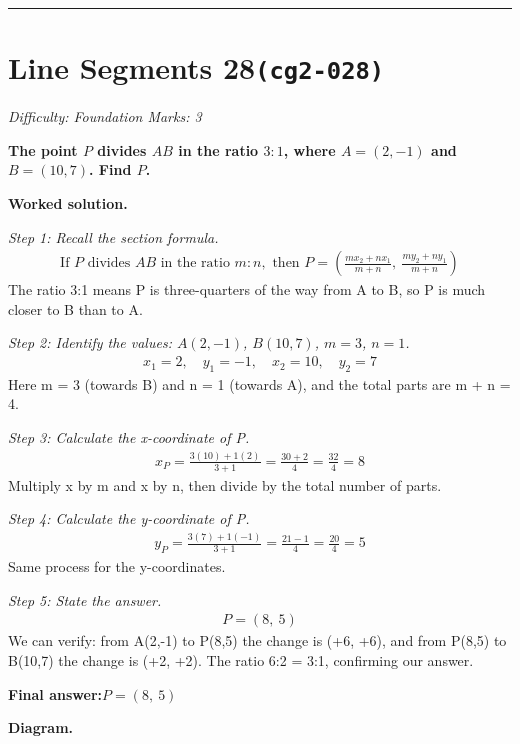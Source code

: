 \documentclass[11pt]{article}
\newcommand{\question}[1]{\par\medskip\noindent\textbf{#1}\par}
\begin{document}
\medskip\hrule

\section*{Line Segments 28\quad\small\texttt{(cg2-028)}}
\textit{Difficulty: Foundation \quad\textbar\quad Marks: 3}

\question{The point \( P \) divides \( AB \) in the ratio \( 3:1 \), where \( A = (2, -1) \) and \( B = (10, 7) \). Find \( P \).}

\textbf{Worked solution.}

\textit{Step 1: Recall the section formula.}
\[\begin{gathered}
\text{If } P \text{ divides } AB \text{ in the ratio } m:n, \text{ then } P = \left(\frac{mx_2 + nx_1}{m+n},\ \frac{my_2 + ny_1}{m+n}\right)
\end{gathered}\]
The ratio 3:1 means P is three-quarters of the way from A to B, so P is much closer to B than to A.

\textit{Step 2: Identify the values: \( A(2, -1) \), \( B(10, 7) \), \( m = 3 \), \( n = 1 \).}
\[\begin{gathered}
x_1 = 2,\quad y_1 = -1,\quad x_2 = 10,\quad y_2 = 7
\end{gathered}\]
Here m = 3 (towards B) and n = 1 (towards A), and the total parts are m + n = 4.

\textit{Step 3: Calculate the x-coordinate of P.}
\[\begin{gathered}
x_P = \frac{3(10) + 1(2)}{3 + 1} = \frac{30 + 2}{4} = \frac{32}{4} = 8
\end{gathered}\]
Multiply x by m and x by n, then divide by the total number of parts.

\textit{Step 4: Calculate the y-coordinate of P.}
\[\begin{gathered}
y_P = \frac{3(7) + 1(-1)}{3 + 1} = \frac{21 - 1}{4} = \frac{20}{4} = 5
\end{gathered}\]
Same process for the y-coordinates.

\textit{Step 5: State the answer.}
\[\begin{gathered}
P = (8,\ 5)
\end{gathered}\]
We can verify: from A(2,-1) to P(8,5) the change is (+6, +6), and from P(8,5) to B(10,7) the change is (+2, +2). The ratio 6:2 = 3:1, confirming our answer.

\begin{answerbox}
\textbf{Final answer:}\quad \(\displaystyle P = (8,\ 5)\)
\end{answerbox}
\textbf{Diagram.}
\end{document}
